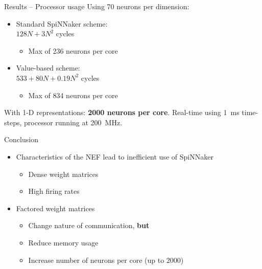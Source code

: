 \documentclass[handout,t]{beamer}
\begin{document}
  \begin{frame}{Results -- Processor usage}
    Using 70 neurons per dimension:
    \begin{itemize}
      \item Standard SpiNNaker scheme:\\
        $128N + 3N^2$ cycles
        \begin{itemize}
          \item Max of 236 neurons per core
        \end{itemize}
      \item Value-based scheme:\\
        $533 + 80N + 0.19N^2$ cycles
        \begin{itemize}
          \item Max of 834 neurons per core
        \end{itemize}
    \end{itemize}

    With 1-D representations: \textbf{2000 neurons per core}.
    \vfill
    {\small\color{black!60!white} Real-time using \SI{1}{\milli\second} time-steps, processor running at \SI{200}{\mega\hertz}.}
  \end{frame}

  \begin{frame}{Conclusion}
    \begin{itemize}
      \item Characteristics of the NEF lead to inefficient use of SpiNNaker
      \begin{itemize}
        \item Dense weight matrices
        \item High firing rates
      \end{itemize}
      \item Factored weight matrices
      \begin{itemize}
        \item Change nature of communication, \textbf{but}
        \item Reduce memory usage
        \item Increase number of neurons per core (up to 2000)
      \end{itemize}
    \end{itemize}
  \end{frame}

  \begin{darkframes}
  \end{darkframes}

\end{document}
